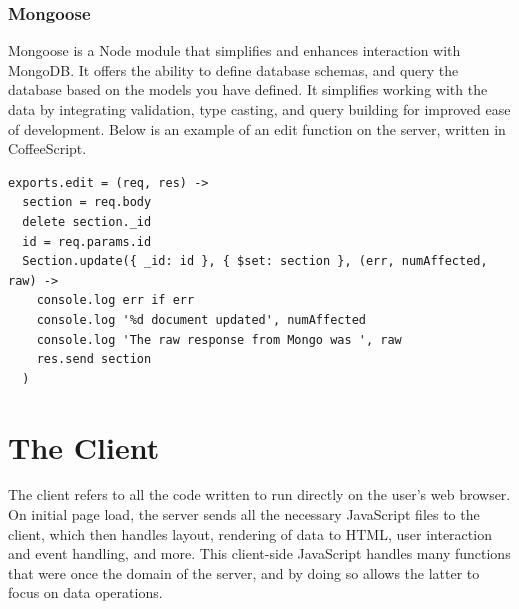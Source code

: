 \documentclass[12pt]{article}
\newcommand{\comment}[1]{{\bf \tt  {#1}}}
\newcommand{\emcomment}[1]{\textcolor{ForestGreen}{\comment{Elena: {#1}}}}
\begin{document}
\subsubsection{Mongoose}\label{sec:mongoose}
Mongoose is a Node module that simplifies and enhances interaction with MongoDB. It offers the ability to define database schemas, and query the database based on the models you have defined. It simplifies working with the data by integrating validation, type casting, and query building for improved ease of development. Below is an example of an edit function on the server, written in CoffeeScript.
\begin{verbatim}
exports.edit = (req, res) ->
  section = req.body
  delete section._id
  id = req.params.id
  Section.update({ _id: id }, { $set: section }, (err, numAffected, raw) ->
    console.log err if err
    console.log '%d document updated', numAffected
    console.log 'The raw response from Mongo was ', raw
    res.send section
  )
\end{verbatim}


\section{The Client}\label{sec:client}
The client refers to all the code written to run directly on the user's web browser. On initial page load, the server sends all the necessary JavaScript files to the client, which then handles layout, rendering of data to HTML, user interaction and event handling, and more. This client-side JavaScript handles many functions that were once the domain of the server, and by doing so allows the latter to focus on data operations.
\end{document}
